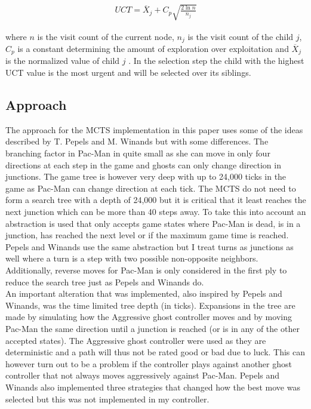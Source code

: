 \documentclass[conference]{IEEEtran}
\begin{document}
\begin{align}
UCT=\overline{X}_{j}+C_{p}\sqrt{\frac{2 \ln n}{n_{j}}} \nonumber
\end{align}

where $n$ is the visit count of the current node, $n_{j}$ is the visit count of the child $j$, $C_{p}$ is a constant determining the amount of exploration over exploitation and $\overline{X}_{j}$ is the normalized value of child $j$ \cite{MCTSsurvey}. In the selection step the child with the highest UCT value is the most urgent and will be selected over its siblings.

\subsection{Approach}
The approach for the MCTS implementation in this paper uses some of the ideas described by T. Pepels and M. Winands \cite{MCTS-Pac-Man} but with some differences. 
The branching factor in Pac-Man in quite small as she can move in only four directions at each step in the game and ghosts can only change direction in junctions. The game tree is however very deep with up to 24,000 ticks in the game as Pac-Man can change direction at each tick. The MCTS do not need to form a search tree with a depth of 24,000 but it is critical that it least reaches the next junction which can be more than 40 steps away. To take this into account an abstraction is used that only accepts game states where Pac-Man is dead, is in a junction, has reached the next level or if the maximum game time is reached. Pepels and Winands use the same abstraction but I treat turns as junctions as well where a turn is a step with two possible non-opposite neighbors. Additionally, reverse moves for Pac-Man is only considered in the first ply to reduce the search tree just as Pepels and Winands do. \\

An important alteration that was implemented, also inspired by Pepels and Winands, was the time limited tree depth (in ticks). 
Expansions in the tree are made by simulating how the Aggressive ghost controller moves and by moving Pac-Man the same direction until a junction is reached (or is in any of the other accepted states). The Aggressive ghost controller were used as they are deterministic and a path will thus not be rated good or bad due to luck. This can however turn out to be a problem if the controller plays against another ghost controller that not always moves aggressively against Pac-Man.
Pepels and Winands also implemented three strategies that changed how the best move was selected but this was not implemented in my controller. 
\end{document}
